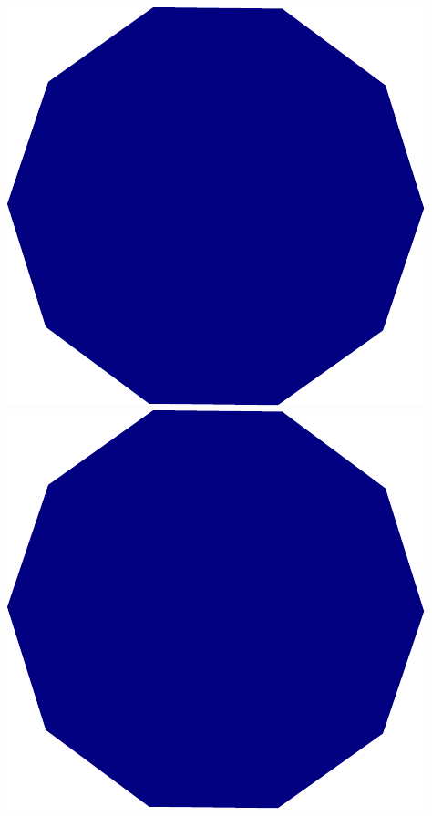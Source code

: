 \documentclass[12pt]{article}
\begin{document}
\begin{center}
\includegraphics[scale=0.1]{figuras/imagen1.pdf} \quad
\includegraphics[scale=0.2]{figuras/imagen1.pdf} \quad

\end{center}
\end{document}
